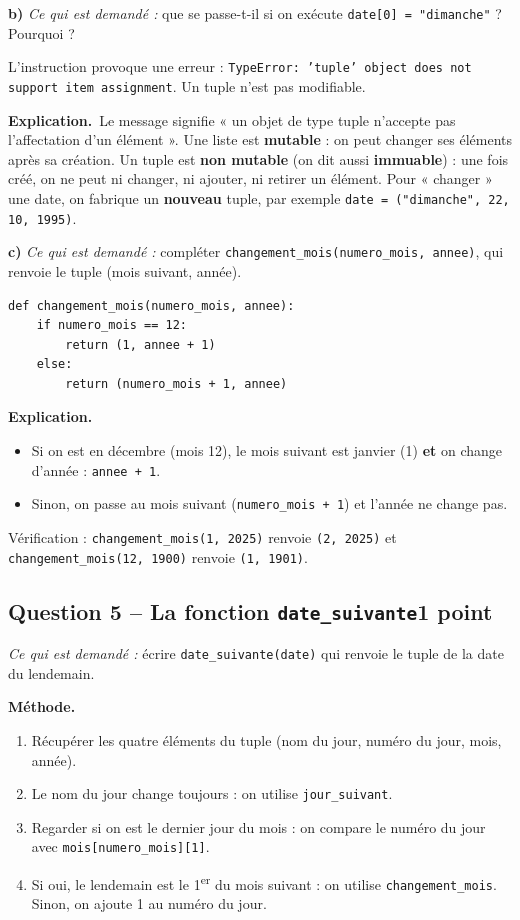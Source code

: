 \documentclass[11pt, a4paper]{exam}
\newcommand{\code}[1]{\texttt{#1}}
\newcommand{\Qt}[2]{\subsection*{#1\hfill{\normalfont\small #2}}}
\newcommand{\rappel}[1]{\noindent\textit{Ce qui est demandé :} #1\par\smallskip}
\newcommand{\methode}{\noindent\textbf{Méthode.}\ }
\newcommand{\explication}{\noindent\textbf{Explication.}\ }
\begin{document}
\textbf{b)} \rappel{que se passe-t-il si on exécute \code{date[0] = "dimanche"} ? Pourquoi ?}
\begin{reponse}
L'instruction provoque une erreur : \code{TypeError: 'tuple' object does not support item assignment}. Un tuple n'est pas modifiable.
\end{reponse}
\explication Le message signifie « un objet de type tuple n'accepte pas l'affectation d'un élément ». Une liste est \textbf{mutable} : on peut changer ses éléments après sa création. Un tuple est \textbf{non mutable} (on dit aussi \textbf{immuable}) : une fois créé, on ne peut ni changer, ni ajouter, ni retirer un élément. Pour « changer » une date, on fabrique un \textbf{nouveau} tuple, par exemple \code{date = ("dimanche", 22, 10, 1995)}.

\textbf{c)} \rappel{compléter \code{changement\_mois(numero\_mois, annee)}, qui renvoie le tuple (mois suivant, année).}
\begin{reponse}
\begin{lstlisting}
def changement_mois(numero_mois, annee):
    if numero_mois == 12:
        return (1, annee + 1)
    else:
        return (numero_mois + 1, annee)
\end{lstlisting}
\end{reponse}
\explication
\begin{itemize}
\item Si on est en décembre (mois 12), le mois suivant est janvier (1) \textbf{et} on change d'année : \code{annee + 1}.
\item Sinon, on passe au mois suivant (\code{numero\_mois + 1}) et l'année ne change pas.
\end{itemize}
Vérification : \code{changement\_mois(1, 2025)} renvoie \code{(2, 2025)} et \code{changement\_mois(12, 1900)} renvoie \code{(1, 1901)}.

\Qt{Question 5 -- La fonction \code{date\_suivante}}{1 point}
\rappel{écrire \code{date\_suivante(date)} qui renvoie le tuple de la date du lendemain.}

\methode
\begin{enumerate}
\item Récupérer les quatre éléments du tuple (nom du jour, numéro du jour, mois, année).
\item Le nom du jour change toujours : on utilise \code{jour\_suivant}.
\item Regarder si on est le dernier jour du mois : on compare le numéro du jour avec \code{mois[numero\_mois][1]}.
\item Si oui, le lendemain est le 1\textsuperscript{er} du mois suivant : on utilise \code{changement\_mois}. Sinon, on ajoute 1 au numéro du jour.
\end{enumerate}
\end{document}

